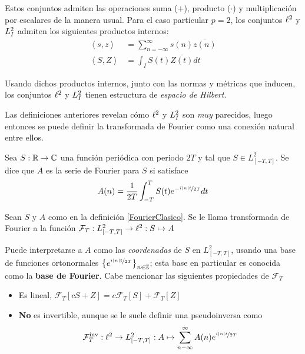 Estos conjuntos admiten las operaciones  suma ($+$), producto ($\cdot$) y multiplicación por 
escalares de la manera usual.
%
Para el caso particular $p=2$, los conjuntos $\ell^{2}$ y $L^{2}_I$ admiten los siguientes productos 
internos:
%
\begin{align*}
\left\langle s,z \right\rangle &= \sum_{n=-\infty}^{\infty} s(n) \overline{z(n)}\\
\left\langle S,Z \right\rangle &= \int_I S(t) \overline{Z(t)} dt
\end{align*}

Usando dichos productos internos, junto con las normas y métricas que inducen, los conjuntos 
$\ell^{2}$ y $L^{2}_I$ tienen estructura de \textit{espacio de Hilbert}.

Las definiciones anteriores revelan cómo $\ell^{2}$ y $L^{2}_I$ son \textit{muy} parecidos, luego
entonces se puede definir la transformada de Fourier como una conexión natural entre ellos.

\begin{definicion}
Sea $S: \mathbb{R} \rightarrow \mathbb{C}$ una función periódica con periodo $2T$ y tal que 
$S \in L^{2}_{[-T,T]}$. Se dice que $A$ es la serie de Fourier para $S$ si satisface
\begin{equation*}
A(n) = \frac{1}{2 T} \int_{- T }^{ T } S(t) e^{-\nicefrac{ i \left| n \right| t}{2T}} dt
\end{equation*}
\label{FourierClasico}
\end{definicion}

\begin{definicion}
Sean $S$ y $A$ como en la definición \ref{FourierClasico}. Se le llama transformada de Fourier a la
función $\mathcal{F}_T : L^{2}_{[-T,T]} \rightarrow \ell^{2} : S \mapsto A$
\end{definicion}

Puede interpretarse a $A$ como las \textit{coordenadas} de $S$ en $L^{2}_{[-T,T]}$, usando una base 
de funciones ortonormales $\left\{ e^{\nicefrac{i \left| n \right| t}{2 T}} \right\}_{n\in \mathbb{Z}}$; esta base 
en particular es conocida como la \textbf{base de Fourier}.
%
Cabe mencionar las siguientes propiedades de $\mathcal{F}_T$
\begin{itemize}
\item Es lineal, $\mathcal{F}_T[cS + Z] = c\mathcal{F}_T[S] + \mathcal{F}_T[Z]$

\item \textbf{No} es invertible, aunque se le suele definir una pseudoinversa como
\begin{equation*}
\mathcal{F}_{T}^{\text{inv}} : \ell^{2} \rightarrow L^{2}_{[-T,T]} :
A \mapsto \sum_{n -\infty}^{\infty} A(n) e^{\nicefrac{i \left| n \right| t}{2 T}}
\end{equation*}
\end{itemize}

